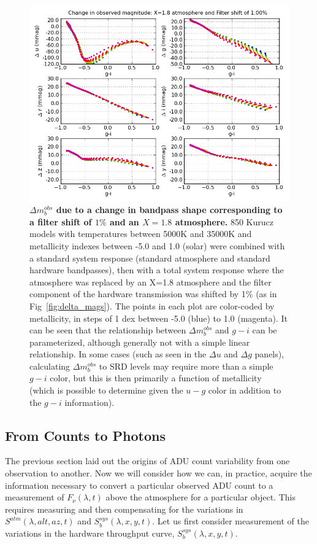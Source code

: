 \documentclass[12pt,preprint]{aastex}
\begin{document}
\begin{figure}[htbp]
\includegraphics[width=6in]{delta_mags2}
\caption{ {\small {\bf $\Delta m_b^{obs}$ due to
a change in bandpass shape corresponding to a filter shift of $1\%$
and an $X=1.8$ atmosphere.} 850 Kurucz models with temperatures
between 5000K and 35000K and metallicity indexes between -5.0 and 1.0
(solar) were combined with a standard system response (standard
atmosphere and standard hardware bandpasses), then with a total system
response where the atmosphere was replaced by an X=1.8 atmosphere and
the filter component of the hardware transmission was shifted by 1\%
(as in Fig~\ref{fig:delta_mags}). The points in each plot are color-coded by
metallicity, in steps of 1 dex between -5.0 (blue) to 1.0 (magenta).  It can be seen that the
relationship between $\Delta m_b^{obs}$ and $g-i$ can be parameterized,
although generally not with a simple linear relationship. In some
cases (such as seen in the $\Delta u$ and $\Delta g$ panels),
calculating $\Delta m_b^{obs}$ to SRD levels may require more than a simple
$g-i$ color, but this is then primarily a function of metallicity
(which is possible to determine given the $u-g$ color in addition to
the $g-i$ information). }
\label{fig:delta_mags2} }
\end{figure}

\subsection{From Counts to Photons}
\label{sec:counts2photons}

The previous section laid out the origins of ADU count variability
from one observation to another. Now we will consider how we can, in
practice, acquire the information necessary to convert a particular
observed ADU count to a measurement of $F_\nu(\lambda,t)$ above the
atmosphere for a particular object.  This requires measuring and then 
compensating for the variations in
$S^{atm}(\lambda,alt,az,t)$ and $S_b^{sys}(\lambda,x,y,t)$.
Let us first consider measurement of the variations in the hardware
throughput curve, $S_b^{sys}(\lambda,x,y,t)$. 
\end{document}
